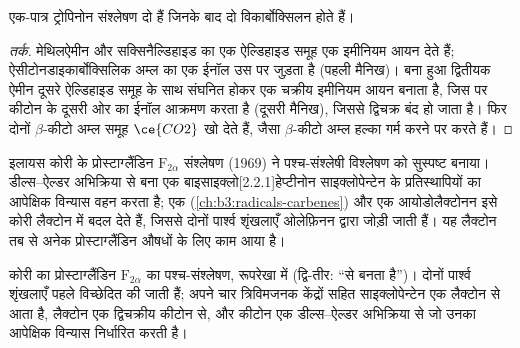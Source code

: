 \begin{proposition}[एक पात्र में ट्रोपिनोन]\label{prop:b3:total-synthesis:tropinone}
एक-पात्र ट्रोपिनोन संश्लेषण दो  हैं जिनके बाद दो
विकार्बोक्सिलन होते हैं।
\end{proposition}

\begin{proof}[तर्क]
मेथिलऐमीन और सक्सिनैल्डिहाइड का एक ऐल्डिहाइड समूह एक इमीनियम आयन देते हैं;
ऐसीटोनडाइकार्बोक्सिलिक अम्ल का एक ईनॉल उस पर जुड़ता है (पहली मैनिख)। बना हुआ द्वितीयक
ऐमीन दूसरे ऐल्डिहाइड समूह के साथ संघनित होकर एक चक्रीय इमीनियम
आयन बनाता है, जिस पर कीटोन के दूसरी ओर का ईनॉल आक्रमण करता है (दूसरी मैनिख),
जिससे द्विचक्र बंद हो जाता है। फिर दोनों $\beta$-कीटो अम्ल समूह $\ce{CO2}$ खो देते हैं, जैसा $\beta$-कीटो अम्ल
हल्का गर्म करने पर करते हैं।
\end{proof}

इलायस कोरी के प्रोस्टाग्लैंडिन $\mathrm F_{2\alpha}$ संश्लेषण (1969) ने पश्च-संश्लेषी विश्लेषण को
सुस्पष्ट बनाया। डील्स--ऐल्डर अभिक्रिया से बना एक बाइसाइक्लो[2.2.1]हेप्टीनोन
साइक्लोपेन्टेन के प्रतिस्थापियों का आपेक्षिक विन्यास वहन करता है; एक
 (\cref{ch:b3:radicals-carbenes}) और एक
आयोडोलैक्टोनन इसे कोरी लैक्टोन में बदल देते हैं, जिससे दोनों पार्श्व शृंखलाएँ
ओलेफ़िनन द्वारा जोड़ी जाती हैं। यह लैक्टोन तब से अनेक प्रोस्टाग्लैंडिन
औषधों के लिए काम आया है।

\begin{omfigure}

{\small कोरी का प्रोस्टाग्लैंडिन $\mathrm F_{2\alpha}$ का पश्च-संश्लेषण, रूपरेखा में (द्वि-तीर: ``से
बनता है'')। दोनों पार्श्व शृंखलाएँ पहले विच्छेदित की जाती हैं; अपने चार त्रिविमजनक
केंद्रों सहित साइक्लोपेन्टेन एक लैक्टोन से आता है, लैक्टोन एक द्विचक्रीय कीटोन से,
और कीटोन एक डील्स--ऐल्डर अभिक्रिया से जो उनका आपेक्षिक
विन्यास निर्धारित करती है।}
\end{omfigure}

